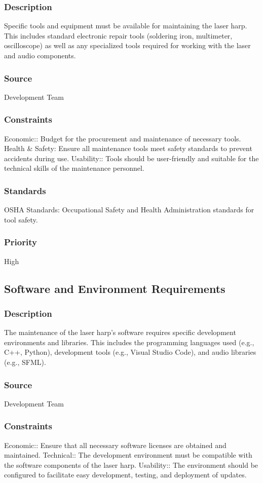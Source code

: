 \subsubsection{Description}
Specific tools and equipment must be available for maintaining the laser harp. This includes standard electronic repair tools (soldering iron, multimeter, oscilloscope) as well as any specialized tools required for working with the laser and audio components.
\subsubsection{Source}
Development Team
\subsubsection{Constraints}
Economic:: Budget for the procurement and maintenance of necessary tools.
Health & Safety: Ensure all maintenance tools meet safety standards to prevent accidents during use.
Usability:: Tools should be user-friendly and suitable for the technical skills of the maintenance personnel.
\subsubsection{Standards}
OSHA Standards: Occupational Safety and Health Administration standards for tool safety.
\subsubsection{Priority}
High


\subsection{Software and Environment Requirements}
\subsubsection{Description}
The maintenance of the laser harp's software requires specific development environments and libraries. This includes the programming languages used (e.g., C++, Python), development tools (e.g., Visual Studio Code), and audio libraries (e.g., SFML).
\subsubsection{Source}
Development Team
\subsubsection{Constraints}
Economic:: Ensure that all necessary software licenses are obtained and maintained.
Technical:: The development environment must be compatible with the software components of the laser harp.
Usability:: The environment should be configured to facilitate easy development, testing, and deployment of updates.
